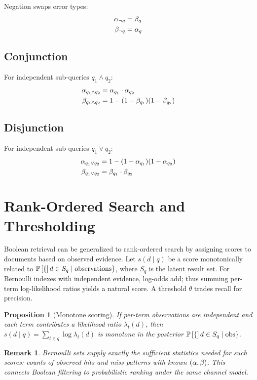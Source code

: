 \documentclass[11pt,final,hidelinks]{article}
\newtheorem{proposition}[theorem]{Proposition}
\newtheorem{remark}[theorem]{Remark}
\begin{document}
Negation swaps error types:
\begin{align}
\alpha_{\neg q} &= \beta_q \\
\beta_{\neg q} &= \alpha_q
\end{align}

\subsection{Conjunction}

For independent sub-queries $q_1 \land q_2$:
\begin{align}
\alpha_{q_1 \land q_2} &= \alpha_{q_1} \cdot \alpha_{q_2} \\
\beta_{q_1 \land q_2} &= 1 - (1 - \beta_{q_1})(1 - \beta_{q_2})
\end{align}

\subsection{Disjunction}

For independent sub-queries $q_1 \lor q_2$:
\begin{align}
\alpha_{q_1 \lor q_2} &= 1 - (1 - \alpha_{q_1})(1 - \alpha_{q_2}) \\
\beta_{q_1 \lor q_2} &= \beta_{q_1} \cdot \beta_{q_2}
\end{align}

\section{Rank-Ordered Search and Thresholding}

Boolean retrieval can be generalized to rank-ordered search by assigning scores to documents based on observed evidence. Let $s(d\mid q)$ be a score monotonically related to $\mathbb{P}\left[\{\right]d\in S_q \mid \text{observations}\}$, where $S_q$ is the latent result set. For Bernoulli indexes with independent evidence, log-odds add; thus summing per-term log-likelihood ratios yields a natural score. A threshold $\theta$ trades recall for precision.

\begin{proposition}[Monotone scoring]
If per-term observations are independent and each term contributes a likelihood ratio $\lambda_t(d)$, then $s(d\mid q)=\sum_{t\in q} \log \lambda_t(d)$ is monotone in the posterior $\mathbb{P}\left[\{\right]d\in S_q\mid\text{obs}\}$.
\end{proposition}

\begin{remark}
Bernoulli sets supply exactly the sufficient statistics needed for such scores: counts of observed hits and miss patterns with known $(\alpha,\beta)$. This connects Boolean filtering to probabilistic ranking under the same channel model.
\end{remark}
\end{document}
